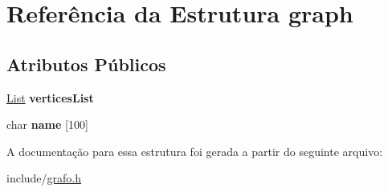 \hypertarget{structgraph}{}\section{Referência da Estrutura graph}
\label{structgraph}
\subsection*{Atributos Públicos}
\begin{DoxyCompactItemize}
\item 
\mbox{\label{structgraph_a0ead4ec9235a10bc2f6cd453e508eac6}} 
\hyperlink{lista_8h_a698ff83165b8296011a50bb9aba83964}{List} {\bfseries vertices\+List}
\item 
\mbox{\label{structgraph_a1889833150d9fb8ca2618ad45b6bda43}} 
char {\bfseries name} \mbox{[}100\mbox{]}
\end{DoxyCompactItemize}


A documentação para essa estrutura foi gerada a partir do seguinte arquivo\+:\begin{DoxyCompactItemize}
\item 
include/\hyperlink{grafo_8h}{grafo.\+h}\end{DoxyCompactItemize}
